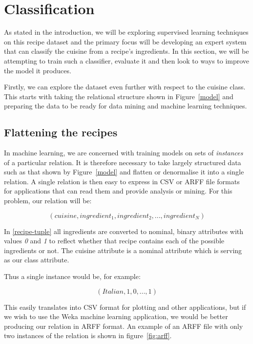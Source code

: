 \documentclass[11pt,a4paper]{article}
\begin{document}
\section{Classification}

As stated in the introduction, we will be exploring supervised learning techniques
on this recipe dataset and the primary focus will be developing an expert system
that can classify the cuisine from a recipe's ingredients. In this section,
we will be attempting to train such a classifier, evaluate it and then
look to ways to improve the model it produces.

Firstly, we can explore the dataset even further with respect to the cuisine class.
This starts with taking the relational structure shown in Figure~\ref{model} and
preparing the data to be ready for data mining and machine learning techniques.

\subsection{Flattening the recipes}

In machine learning, we are concerned with training models on sets of \emph{instances}
of a particular relation. It is therefore necessary to take largely structured
data such as that shown by Figure~\ref{model} and flatten or denormalise it into
a single relation. A single relation is then easy to express in CSV or ARFF file
formats for applications that can read them and provide analysis or mining. For this
problem, our relation will be:

\begin{equation} \label{recipe-tuple}
(cuisine, ingredient_1, ingredient_2, ... ,ingredient_N)
\end{equation}

In \eqref{recipe-tuple} all ingredients are converted to nominal, binary attributes
with values \emph{0} and \emph{1} to reflect whether that recipe contains
each of the possible ingredients or not. The cuisine attribute is a nominal
attribute which is serving as our class attribute.

Thus a single instance would be, for example:

\begin{equation} \label{recipe-example}
(Italian,1,0,...,1)
\end{equation}

This easily translates into CSV format for plotting and other applications, but if
we wish to use the Weka machine learning application, we would be better producing
our relation in ARFF format. \cite{witten2011data} An example of an ARFF file with only two
instances of the relation is shown in figure~\ref{fig:arff}.
\end{document}
